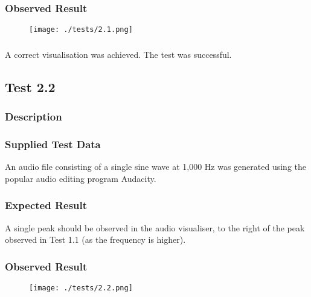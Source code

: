 \subsubsection{Observed Result}
\begin{figure}[H]
	\texttt{[image: ./tests/2.1.png]}
\end{figure}

\subsubsection{}
A correct visualisation was achieved. The test was successful.

\pagebreak
\subsection{Test 2.2}
\subsubsection{Description}
\paragraph{}
{
	\centering
}

\subsubsection{Supplied Test Data}
An audio file consisting of a single sine wave at 1,000 Hz was generated using the popular audio editing program Audacity.

\subsubsection{Expected Result}
A single peak should be observed in the audio visualiser, to the right of the peak observed in Test 1.1 (as the frequency is higher).

\subsubsection{Observed Result}
\begin{figure}[H]
	\texttt{[image: ./tests/2.2.png]}
\end{figure}

